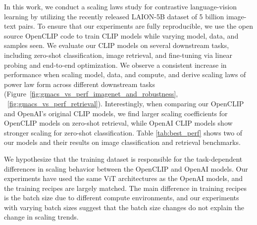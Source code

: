 \documentclass[11pt,table]{article}
\newcommand{\citep}{\cite}
\begin{document}
In this work, we conduct a scaling laws study for contrastive language-vision learning by utilizing the recently released LAION-5B \citep{Schuhmann2022} dataset of 5 billion image-text pairs.
To ensure that our experiments are fully reproducible, we use the open source OpenCLIP \citep{ilharco_gabriel_2021_5143773} code to train CLIP models while varying model, data, and samples seen.
We evaluate our CLIP models on several downstream tasks, including zero-shot classification, image retrieval, and fine-tuning via linear probing and end-to-end optimization.
We observe a consistent increase in performance when scaling model, data, and compute, and derive scaling laws of power law form across different downstream tasks (Figure~\ref{fig:gmacs_vs_perf_imagenet_and_robustness}, ~\ref{fig:gmacs_vs_perf_retrieval}).
Interestingly, when comparing our OpenCLIP and OpenAI’s original CLIP models, we find larger scaling coefficients for OpenCLIP models on zero-shot retrieval, while OpenAI CLIP models show stronger scaling for zero-shot classification.
Table \ref{tab:best_perf} shows two of our models and their results on image classification and retrieval benchmarks.





We hypothesize that the training dataset is responsible for the task-dependent differences in scaling behavior between the OpenCLIP and OpenAI models.
Our experiments have used the same ViT architectures as the OpenAI models, and the training recipes are largely matched.
The main difference in training recipes is the batch size due to different compute environments, and our experiments with varying batch sizes suggest that the batch size changes do not explain the change in scaling trends.
\end{document}
